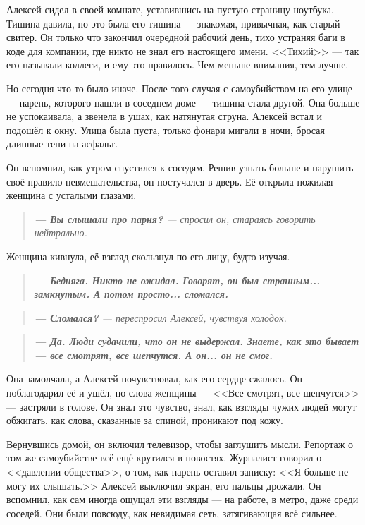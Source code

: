 \documentclass[12pt,a4paper]{book}
\newenvironment{dialogue}{\begin{quote}\itshape}{\end{quote}}
\begin{document}
Алексей сидел в своей комнате, уставившись на пустую страницу ноутбука. Тишина давила, но это была его тишина --- знакомая, привычная, как старый свитер. Он только что закончил очередной рабочий день, тихо устраняя баги в коде для компании, где никто не знал его настоящего имени. <<Тихий>> --- так его называли коллеги, и ему это нравилось. Чем меньше внимания, тем лучше.

Но сегодня что-то было иначе. После того случая с самоубийством на его улице --- парень, которого нашли в соседнем доме --- тишина стала другой. Она больше не успокаивала, а звенела в ушах, как натянутая струна. Алексей встал и подошёл к окну. Улица была пуста, только фонари мигали в ночи, бросая длинные тени на асфальт.

Он вспомнил, как утром спустился к соседям. Решив узнать больше и нарушить своё правило невмешательства, он постучался в дверь. Её открыла пожилая женщина с усталыми глазами.

\begin{dialogue}
\textbf{--- Вы слышали про парня?} --- спросил он, стараясь говорить нейтрально.
\end{dialogue}

Женщина кивнула, её взгляд скользнул по его лицу, будто изучая.

\begin{dialogue}
\textbf{--- Бедняга. Никто не ожидал. Говорят, он был странным... замкнутым. А потом просто... сломался.}
\end{dialogue}

\begin{dialogue}
\textbf{--- Сломался?} --- переспросил Алексей, чувствуя холодок.
\end{dialogue}

\begin{dialogue}
\textbf{--- Да. Люди судачили, что он не выдержал. Знаете, как это бывает --- все смотрят, все шепчутся. А он... он не смог.}
\end{dialogue}

Она замолчала, а Алексей почувствовал, как его сердце сжалось. Он поблагодарил её и ушёл, но слова женщины --- <<Все смотрят, все шепчутся>> --- застряли в голове. Он знал это чувство, знал, как взгляды чужих людей могут обжигать, как слова, сказанные за спиной, проникают под кожу.

Вернувшись домой, он включил телевизор, чтобы заглушить мысли. Репортаж о том же самоубийстве всё ещё крутился в новостях. Журналист говорил о <<давлении общества>>, о том, как парень оставил записку: <<Я больше не могу их слышать.>> Алексей выключил экран, его пальцы дрожали. Он вспомнил, как сам иногда ощущал эти взгляды --- на работе, в метро, даже среди соседей. Они были повсюду, как невидимая сеть, затягивающая всё сильнее.
\end{document}
